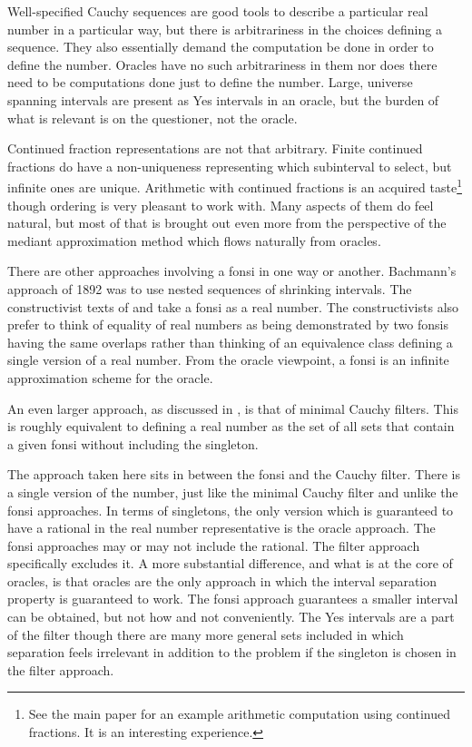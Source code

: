 \documentclass[12pt]{article}
\begin{document}
Well-specified Cauchy sequences are good tools to describe a particular real number in a particular way, but there is arbitrariness in the choices defining a sequence. They also essentially demand the computation be done in order to define the number. Oracles have no such arbitrariness in them nor does there need to be computations done just to define the number. Large, universe spanning intervals are present as Yes intervals in an oracle, but the burden of what is relevant is on the questioner, not the oracle. 

Continued fraction representations are not that arbitrary. Finite continued fractions do have a non-uniqueness representing which subinterval to select, but infinite ones are unique. Arithmetic with continued fractions is an acquired taste\footnote{See the main paper for an example arithmetic computation using continued fractions. It is an interesting experience.} though ordering is very pleasant to work with. Many aspects of them do feel natural, but most of that is brought out even more from the perspective of the mediant approximation method which flows naturally from oracles. 

There are other approaches involving a fonsi in one way or another. Bachmann's approach of 1892 was to use nested sequences of shrinking intervals. The constructivist texts of \cite{bridger} and \cite{bridges} take a fonsi as a real number. The constructivists also prefer to think of equality of real numbers as being demonstrated by two fonsis having the same overlaps rather than thinking of an equivalence class defining a single version of a real number.  From the oracle viewpoint, a fonsi is an infinite approximation scheme for the oracle. 


An even larger approach, as discussed in \cite{ittay-2015}, is that of minimal Cauchy filters. This is roughly equivalent to defining a real number as the set of all sets that contain a given fonsi without including the singleton. 

The approach taken here sits in between the fonsi and the Cauchy filter. There is a single version of the number, just like the minimal Cauchy filter and unlike the fonsi approaches. In terms of singletons, the only version which is guaranteed to have a rational in the real number representative is the oracle approach. The fonsi approaches may or may not include the rational. The filter approach specifically excludes it. A more substantial difference, and what is at the core of oracles, is that oracles are the only approach in which the interval separation property is guaranteed to work. The fonsi approach guarantees a smaller interval can be obtained, but not how and not conveniently. The Yes intervals are a part of the filter though there are many more general sets included in which separation feels irrelevant in addition to the problem if the singleton is chosen in the filter approach. 
\end{document}
